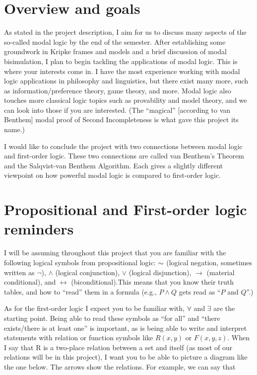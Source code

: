 \section{Overview and goals}
As stated in the project description, I aim for us to discuss many aspects of the so-called modal logic by the end of the semester. 
After establishing some groundwork in Kripke frames and models and a brief discussion of modal bisimulation, I plan to begin tackling 
the applications of modal logic. This is where your interests come in. I have the most experience working with modal logic 
applications in philosophy and linguistics, but there exist many more, such as information/preference theory, game theory, and more. 
Modal logic also touches more classical logic topics such as provability and model theory, and we can look into those if you are interested. 
(The ``magical'' [according to van Benthem] modal proof of Second Incompleteness is what gave this project its name.)

I would like to conclude the project with two connections between modal logic and first-order logic. 
These two connections are called van Benthem's Theorem and the Salqvist-van Benthem Algorithm. 
Each gives a slightly different viewpoint on how powerful modal logic is compared to first-order logic.

\section{Propositional and First-order logic reminders}

I will be assuming throughout this project that you are familiar with the following logical symbols from propositional logic: $\mathord{\sim}$ (logical negation,
sometimes written as $\neg$), $\wedge$ (logical conjunction), $\vee$ (logical disjunction), $\rightarrow$ (material conditional), and $\leftrightarrow$ 
(biconditional).This means that you know their truth tables, and how to “read” them in a formula (e.g., $P \wedge Q$
gets read as ``$P$ and $Q$''.)

As for the first-order logic I expect you to be familiar with, $\forall$ and $\exists$ are the starting point. 
Being able to read these symbols as ``for all'' and ``there exists/there is at least one'' is important, as is being able to write and interpret statements with
relation or function symbols like $R(x,y)$ or $F(x, y, z)$. When I say that R is a two-place relation between a 
set and itself (as most of our relations will be in this project), I want you to be able to picture a 
diagram like the one below. The arrows show the relations. For example, we can say that
